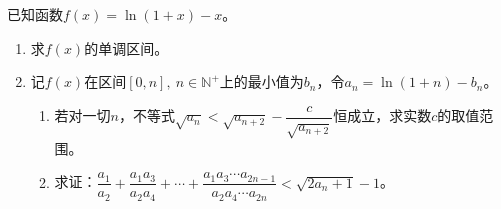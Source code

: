 \begin{que}
	已知函数$f(x)=\ln(1+x)-x$。\label{an}
	\begin{enumerate}
		\item 求$f(x)$的单调区间。
		\item 记$f(x)$在区间$[0,n],\ n\in\mathbb{N}^+$上的最小值为$b_n$，令$a_n=\ln(1+n)-b_n$。
		\begin{enumerate}
			\item 若对一切$n$，不等式$\sqrt{a_n}<\sqrt{a_{n+2}}-\dfrac{c}{\sqrt{a_{n+2}}}$恒成立，求实数$c$的取值范围。
			\item 求证：$\dfrac{a_1}{a_2}+\dfrac{a_1a_3}{a_2a_4}+\cdots+\dfrac{a_1a_3\cdots a_{2n-1}}{a_2 a_4\cdots a_{2n}}<\sqrt{2a_n+1}-1$。
		\end{enumerate}
	\end{enumerate}
\end{que}
\par\hfill\gk{}\easy\par

